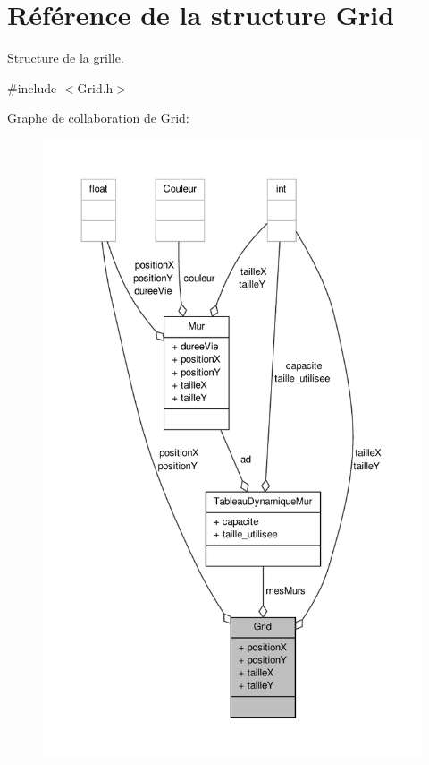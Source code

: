 \hypertarget{structGrid}{\section{Référence de la structure Grid}
\label{structGrid}
}


Structure de la grille.  




{\ttfamily \#include $<$Grid.\-h$>$}



Graphe de collaboration de Grid\-:\nopagebreak
\begin{figure}[H]
\begin{center}
\leavevmode
\includegraphics[width=350pt]{structGrid__coll__graph}
\end{center}
\end{figure}
